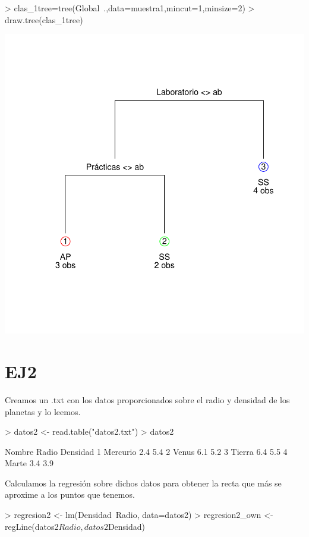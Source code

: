 \documentclass [a4paper] {article}
\begin{document}
\begin{center}
\begin{Schunk}
\begin{Sinput}
> clas_1tree=tree(Global~.,data=muestra1,mincut=1,minsize=2) 
> draw.tree(clas_1tree)
\end{Sinput}
\end{Schunk}
\includegraphics{entrega2-tree1}
\end{center}

\section{EJ2}
Creamos un .txt con los datos proporcionados sobre el radio y densidad de los planetas y lo leemos.
\begin{Schunk}
\begin{Sinput}
> datos2 <- read.table("datos2.txt")
> datos2
\end{Sinput}
\begin{Soutput}
    Nombre Radio Densidad
1 Mercurio   2.4      5.4
2    Venus   6.1      5.2
3   Tierra   6.4      5.5
4    Marte   3.4      3.9
\end{Soutput}
\end{Schunk}

Calculamos la regresión sobre dichos datos para obtener la recta que más se aproxime a los puntos que tenemos.
\begin{Schunk}
\begin{Sinput}
> regresion2 <- lm(Densidad~Radio, data=datos2)
> regresion2_own <- regLine(datos2$Radio, datos2$Densidad)
\end{Sinput}
\end{Schunk}
\end{document}
